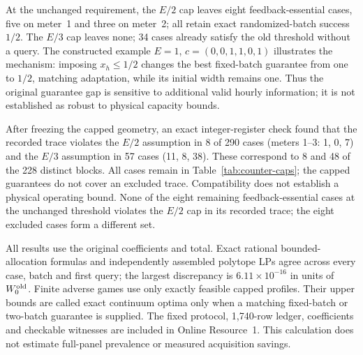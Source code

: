 \documentclass[12pt]{article}
\begin{document}
At the unchanged requirement, the $E/2$ cap leaves eight feedback-essential
cases, five on meter~1 and three on meter~2; all retain exact randomized-batch
success $1/2$. The $E/3$ cap leaves none; 34 cases already satisfy the
old threshold without a query. The constructed example
$E=1$, $c=(0,0,1,1,0,1)$ illustrates the mechanism: imposing $x_h\leq1/2$
changes the best fixed-batch guarantee from one to $1/2$, matching
adaptation, while its initial width remains one.
Thus the original guarantee gap is sensitive to additional valid hourly
information; it is not established as robust to physical capacity bounds.

After freezing the capped geometry, an exact integer-register check found
that the recorded trace violates the $E/2$ assumption in 8 of 290 cases
(meters 1--3: 1, 0, 7) and the $E/3$ assumption in 57 cases (11, 8, 38).
These correspond to 8 and 48 of the 228 distinct blocks. All cases remain
in Table~\ref{tab:counter-caps}; the capped guarantees do not cover an
excluded trace. Compatibility does not establish a physical operating bound.
None of the eight remaining feedback-essential cases at the unchanged
threshold violates the $E/2$ cap in its recorded trace; the eight excluded
cases form a different set.

All results use the original coefficients and total. Exact rational
bounded-allocation formulas and independently assembled polytope LPs
agree across every case, batch and first query; the largest discrepancy
is $6.11\times10^{-16}$ in units of $W_0^{\rm old}$.
Finite adverse games use only exactly feasible capped profiles.
Their upper bounds are called exact continuum optima only when a
matching fixed-batch or two-batch guarantee is supplied.
The fixed protocol, 1,740-row ledger, coefficients and checkable witnesses
are included in Online Resource~1. This calculation does not estimate
full-panel prevalence or measured acquisition savings.

\FloatBarrier
\end{document}
